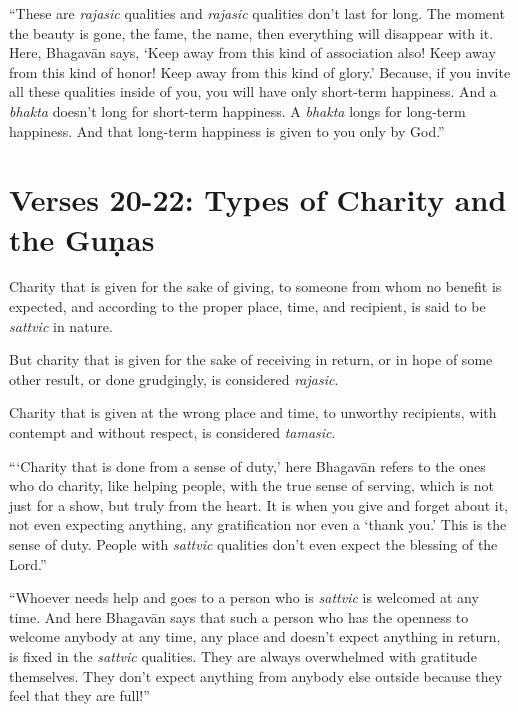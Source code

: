 \enquote{These are \textit{rajasic} qualities and \textit{rajasic} qualities don’t last for long. The moment the beauty is gone, the fame, the name, then everything will disappear with it. Here, Bhagavān says, \enquote{Keep away from this kind of association also! Keep away from this kind of honor! Keep away from this kind of glory.} Because, if you invite all these qualities inside of you, you will have only short-term happiness. And a \textit{bhakta} doesn’t long for short-term happiness. A \textit{bhakta} longs for long-term happiness. And that long-term happiness is given to you only by God.}

\section{Verses 20-22: Types of Charity and the Guṇas}\label{sec-verses-20-22-types-of-charity-and-the-gunas}

{Charity that is given for the sake of giving, to someone from whom no benefit is expected, and according to the proper place, time, and recipient, is said to be \textit{sattvic} in nature.}

{But charity that is given for the sake of receiving in return, or in hope of some other result, or done grudgingly, is considered \textit{rajasic}.}

{Charity that is given at the wrong place and time, to unworthy recipients, with contempt and without respect, is considered \textit{tamasic}.}

\enquote{\enquote{Charity that is done from a sense of duty,} here Bhagavān refers to the ones who do charity, like helping people, with the true sense of serving, which is not just for a show, but truly from the heart. It is when you give and forget about it, not even expecting anything, any gratification nor even a \enquote{thank you.} This is the sense of duty. People with \textit{sattvic} qualities don’t even expect the blessing of the Lord.}

\enquote{Whoever needs help and goes to a person who is \textit{sattvic} is welcomed at any time. And here Bhagavān says that such a person who has the openness to welcome anybody at any time, any place and doesn’t expect anything in return, is fixed in the \textit{sattvic} qualities. They are always overwhelmed with gratitude themselves. They don’t expect anything from anybody else outside because they feel that they are full!}

